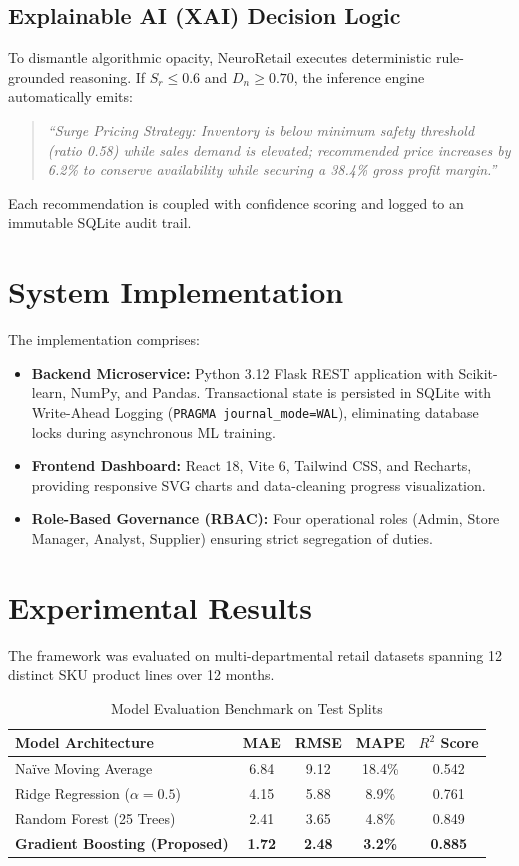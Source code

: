 \documentclass[conference]{IEEEtran}
\begin{document}
\subsection{Explainable AI (XAI) Decision Logic}
To dismantle algorithmic opacity, NeuroRetail executes deterministic rule-grounded reasoning. If $S_r \le 0.6$ and $D_n \ge 0.70$, the inference engine automatically emits:
\begin{quote}
\textit{``Surge Pricing Strategy: Inventory is below minimum safety threshold (ratio 0.58) while sales demand is elevated; recommended price increases by 6.2\% to conserve availability while securing a 38.4\% gross profit margin.''}
\end{quote}
Each recommendation is coupled with confidence scoring and logged to an immutable SQLite audit trail.

\section{System Implementation}
The implementation comprises:
\begin{itemize}
    \item \textbf{Backend Microservice:} Python 3.12 Flask REST application with Scikit-learn, NumPy, and Pandas. Transactional state is persisted in SQLite with Write-Ahead Logging (\texttt{PRAGMA journal\_mode=WAL}), eliminating database locks during asynchronous ML training.
    \item \textbf{Frontend Dashboard:} React 18, Vite 6, Tailwind CSS, and Recharts, providing responsive SVG charts and data-cleaning progress visualization.
    \item \textbf{Role-Based Governance (RBAC):} Four operational roles (Admin, Store Manager, Analyst, Supplier) ensuring strict segregation of duties.
\end{itemize}

\section{Experimental Results}
The framework was evaluated on multi-departmental retail datasets spanning 12 distinct SKU product lines over 12 months.

\begin{table}[htbp]
\caption{Model Evaluation Benchmark on Test Splits}
\begin{center}
\begin{tabular}{lcccc}
\toprule
\textbf{Model Architecture} & \textbf{MAE} & \textbf{RMSE} & \textbf{MAPE} & \textbf{\boldmath$R^2$ Score} \\
\midrule
Naïve Moving Average & 6.84 & 9.12 & 18.4\% & 0.542 \\
Ridge Regression ($\alpha=0.5$) & 4.15 & 5.88 & 8.9\% & 0.761 \\
Random Forest (25 Trees) & 2.41 & 3.65 & 4.8\% & 0.849 \\
\textbf{Gradient Boosting (Proposed)} & \textbf{1.72} & \textbf{2.48} & \textbf{3.2\%} & \textbf{0.885} \\
\bottomrule
\end{tabular}
\label{tab:results}
\end{center}
\end{table}
\end{document}
